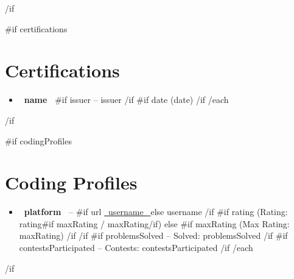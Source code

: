 \documentclass[10pt,a4paper]{article}
\begin{document}
{{/if}}



{{#if certifications}}

\section{Certifications}

\begin{itemize}

{{#each certifications}}
    \item
    \textbf{ {{~name~}} }
    {{#if issuer}}
    -- {{issuer}}
    {{/if}}
    {{#if date}}
    ({{date}})
    {{/if}}
{{/each}}

\end{itemize}

{{/if}}


{{#if codingProfiles}}

\section{Coding Profiles}

\begin{itemize}

{{#each codingProfiles}}
    \item
    \textbf{ {{~platform~}} } -- 
    {{#if url}}
    \href{ {{~url~}} }{ {{~username~}} }
    {{else}}
    {{username}}
    {{/if}}
    {{#if rating}}
    (Rating: {{rating}}{{#if maxRating}} / {{maxRating}}{{/if}})
    {{else}}
    {{#if maxRating}}
    (Max Rating: {{maxRating}})
    {{/if}}
    {{/if}}
    {{#if problemsSolved}}
    -- Solved: {{problemsSolved}}
    {{/if}}
    {{#if contestsParticipated}}
    -- Contests: {{contestsParticipated}}
    {{/if}}
{{/each}}

\end{itemize}

{{/if}}
\end{document}
